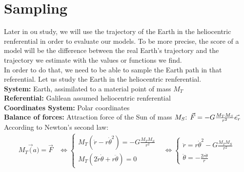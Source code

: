 \section{Sampling}
Later in ou study, we will use the trajectory of the Earth in the heliocentric renferential in order to evaluate our models. To be more precise, the score of a model will be the difference between the real Earth's trajectory and the trajectory we estimate with the values or functions we find.\\
In order to do that, we need to be able to sample the Earth path in that referential. Let us study the Earth in the heliocentric renferential.\\

\noindent
\textbf{System:} Earth, assimilated to a material point of mass \(M_{T}\)\\
\textbf{Referential:} Galilean assumed heliocentric renferential\\
\textbf{Coordinates System:} Polar coordinates\\
\textbf{Balance of forces:} Attraction force of the Sun of mass \(M_{S}$: $\vec{F} = -G\frac{M_{T} M_{S}}{r^{2}}\vec{e_{r}}\)\\

According to Newton's second law:
\[
\begin{align*}
M_{T}\vec(a) = \vec{F}
& \iff
\begin{equation}
    \begin{cases}
    M_{T}(\ddot{r}-r\dot{\theta}^{2}) = -G\frac{M_{T} M_{S}}{r^{2}}\\
    M_{T}(2\dot{r}\dot{\theta}+r\ddot{\theta}) = 0
    \end{cases}
\end{equation}
& \iff
\begin{equation}
    \begin{cases}
    \ddot{r} = r\dot{\theta}^{2}-G\frac{M_{T} M_{S}}{r^{2}}\\
    \ddot{\theta} = -\frac{2\dot{r}\dot{\theta}}{r}
    \end{cases}
\end{equation}
\end{align*}
\]


